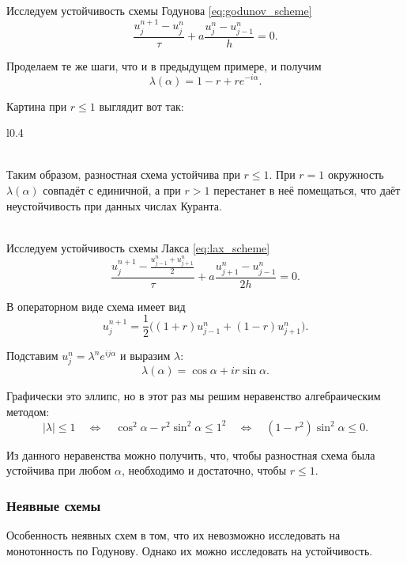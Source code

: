 \documentclass{article}
\begin{document}
\begin{example}
	Исследуем устойчивость схемы Годунова \eqref{eq:godunov_scheme}
	\[\frac{u_j^{n+1}-u_j^n}{\tau}+a\frac{u_j^n-u_{j-1}^n}{h}=0.\]

	Проделаем те же шаги, что и в предыдущем примере, и получим
	\[\lambda(\alpha)=1-r+re^{-i\alpha}.\]
	
	\newpage
	Картина при $r\le 1$ выглядит вот так:
	{\makeatletter
	\let\par\@@par
	\par{}
	\everypar{}

	\begin{wrapfigure}{l}{0.4\textwidth}
		
	\end{wrapfigure}

	\leavevmode\\
	Таким образом, разностная схема устойчива при $r\le 1$. При $r=1$
	окружность $\lambda(\alpha)$ совпадёт с единичной, а при $r>1$
	перестанет в неё помещаться, что даёт неустойчивость при данных числах
	Куранта.\\\\
	\par}
\end{example}

\begin{example}
	Исследуем устойчивость схемы Лакса \eqref{eq:lax_scheme}
	\[\frac{u_j^{n+1}-\frac{u_{j-1}^n+u_{j+1}^n}{2}}{\tau}+
	a\frac{u_{j+1}^n-u_{j-1}^n}{2h}=0.\]

	В операторном виде схема имеет вид
	\[u_j^{n+1}=\frac{1}{2}\big((1+r)u_{j-1}^n+(1-r)u_{j+1}^n\big).\]

	Подставим $u_j^n=\lambda^ne^{ij\alpha}$ и выразим $\lambda$:
	\[\lambda(\alpha)=\cos\alpha+ir\sin\alpha.\]

	Графически это эллипс, но в этот раз мы решим неравенство алгебраическим
	методом:
	\[|\lambda|\le 1\quad\Leftrightarrow\quad\cos^2\alpha-r^2\sin^2\alpha\le
	1^2\quad\Leftrightarrow\quad(1-r^2)\sin^2\alpha\le 0.\]

	Из данного неравенства можно получить, что, чтобы разностная схема была
	устойчива при любом $\alpha$, необходимо и достаточно, чтобы $r\le 1$.
\end{example}

\subsubsection{Неявные схемы}
Особенность неявных схем в том, что их невозможно исследовать на монотонность по
Годунову. Однако их можно исследовать на устойчивость.
\end{document}
